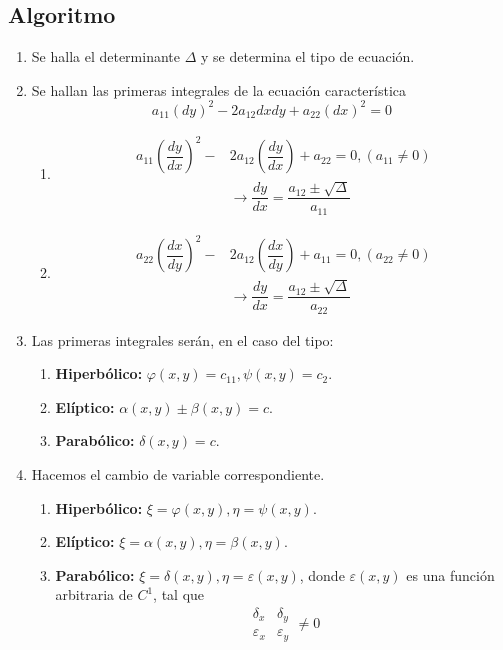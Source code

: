 \documentclass[../main]{subfiles}
\begin{document}
\subsection{Algoritmo}
\begin{enumerate}
    \item Se halla el determinante $\Delta$ y se determina el tipo de ecuación.
    \item Se hallan las primeras integrales de la ecuación característica
    $$a_{11}(dy)^2-2a_{12}dxdy+a_{22}(dx)^2=0$$
    \begin{enumerate}[label=(\alph*)]
        \item 
        \begin{align*}
            a_{11}\left(\dfrac{dy}{dx}\right)^2-&2a_{12}\left(\dfrac{dy}{dx}\right)+a_{22}=0, (a_{11}\neq 0) \\
            &\rightarrow \dfrac{dy}{dx}=\dfrac{a_{12}\pm \sqrt{\Delta}}{a_{11}}
        \end{align*}
        \item 
        \begin{align*}
            a_{22}\left(\dfrac{dx}{dy}\right)^2-&2a_{12}\left(\dfrac{dx}{dy}\right)+a_{11}=0, (a_{22}\neq 0) \\
            &\rightarrow \dfrac{dy}{dx}=\dfrac{a_{12}\pm \sqrt{\Delta}}{a_{22}}
        \end{align*}
    \end{enumerate}
    \item Las primeras  integrales serán, en el caso del tipo:
    \begin{enumerate}[label=(\alph*)]
        \item \textbf{Hiperbólico:} $\varphi(x,y)=c_{11}, \psi(x,y)=c_2$.
        \item \textbf{Elíptico:} $\alpha(x,y)\pm \beta(x,y)=c$.
        \item \textbf{Parabólico:} $\delta(x,y)=c$.
    \end{enumerate}
    \item Hacemos el cambio de variable correspondiente.
    \begin{enumerate}[label=(\alph*)]
        \item \textbf{Hiperbólico:} $\xi = \varphi(x,y), \eta=\psi(x,y)$.
        \item \textbf{Elíptico:} $\xi=\alpha(x,y), \eta = \beta(x,y)$.
        \item \textbf{Parabólico:} $\xi=\delta(x,y), \eta=\varepsilon(x,y)$, donde $\varepsilon(x,y)$ es una función arbitraria de $C^1$, tal que
        $$
        \begin{array}{|cc|}
           \delta_x  &  \delta_y\\
           \varepsilon_x  &  \varepsilon_y
        \end{array}
        \neq 0
        $$
    \end{enumerate}
\end{enumerate}
\end{document}
